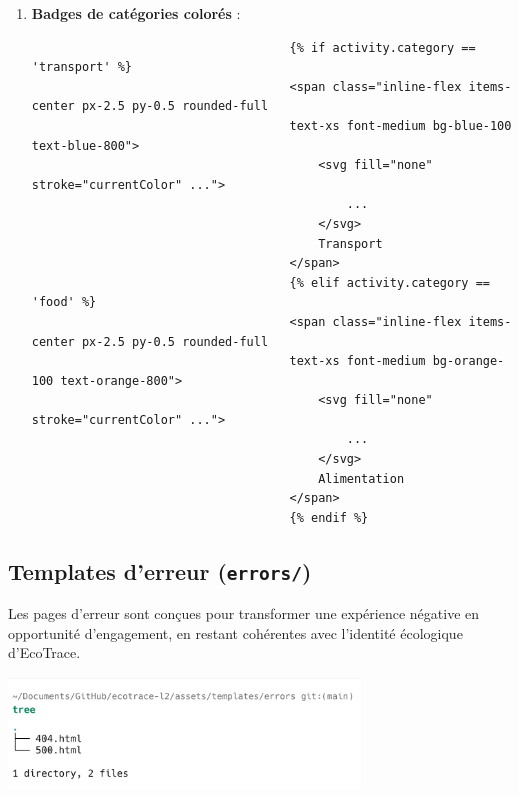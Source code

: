 \documentclass[a4paper,11pt]{article}
\begin{document}
\begin{enumerate}
                        \item \textbf{Badges de catégories colorés} :
                            \begin{tcolorbox}[colback=lightgray!5, colframe=gray!80, left=-70mm, right=5mm, top=2mm, bottom=0mm, boxrule=0.1mm]
                                \begin{verbatim}
                                    {% if activity.category == 'transport' %}
                                    <span class="inline-flex items-center px-2.5 py-0.5 rounded-full 
                                    text-xs font-medium bg-blue-100 text-blue-800">
                                        <svg fill="none" stroke="currentColor" ...">
                                            ...
                                        </svg>
                                        Transport
                                    </span>
                                    {% elif activity.category == 'food' %}
                                    <span class="inline-flex items-center px-2.5 py-0.5 rounded-full 
                                    text-xs font-medium bg-orange-100 text-orange-800">
                                        <svg fill="none" stroke="currentColor" ...">
                                            ...
                                        </svg>
                                        Alimentation
                                    </span>
                                    {% endif %}
                                \end{verbatim}
                            \end{tcolorbox}
                    \end{enumerate}

            \subsection{Templates d'erreur (\texttt{errors/})}
                \noindent Les pages d'erreur sont conçues pour transformer une expérience négative en opportunité d'engagement, en restant cohérentes avec l'identité écologique d'EcoTrace.

                \begin{center}
                    \includegraphics[width=0.7\textwidth]{captures/templates_et_static/templates/errors/img1.png}
                \end{center}
\end{document}
